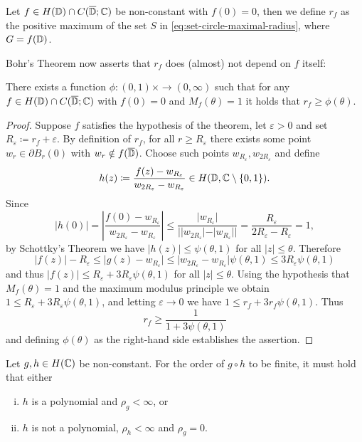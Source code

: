 \begin{definition}
    Let $f \in H(\mathbb{D}) \cap C(\overline{\mathbb{D}}; \mathbb{C})$ be non-constant with $f(0) = 0$, then we define $r_f$ as the positive maximum of the set $S$ in \eqref{eq:set-circle-maximal-radius}, where $G = f(\mathbb{D})$.
\end{definition}

Bohr's Theorem now asserts that $r_f$ does (almost) not depend on $f$ itself:

\begin{theorem}[Bohr] \label{thm:bohr}
    There exists a function ${\phi : (0, 1) \times \to (0, \infty)}$ such that for any $f \in H(\mathbb{D}) \cap C(\overline{\mathbb{D}}; \mathbb{C})$ with $f(0) = 0$ and $M_f(\theta) = 1$ it holds that $r_f \geq \phi(\theta)$.
\end{theorem}

\begin{proof}
    Suppose $f$ satisfies the hypothesis of the theorem, let $\varepsilon > 0$ and set $R_\varepsilon \coloneqq r_f + \varepsilon$. By definition of $r_f$, for all $r \geq R_\varepsilon$ there exists some point $w_r \in \partial B_r(0)$ with $w_r \notin f(\overline{\mathbb{D}})$. Choose such points $w_{R_\varepsilon}, w_{2 R_\varepsilon}$ and define
    $$ h(z) \coloneqq \frac{f(z) - w_{R_\varepsilon}}{w_{2 R_\varepsilon} - w_{R_\varepsilon}} \in H(\mathbb{D}, \mathbb{C} \setminus \{ 0, 1 \}). $$
    Since
    $$ \vert h(0) \vert = \left\vert \frac{f(0) - w_{R_\varepsilon}}{w_{2 R_\varepsilon} - w_{R_\varepsilon}} \right\vert \leq \frac{\vert w_{R_\varepsilon} \vert}{\vert \vert w_{2 R_\varepsilon} \vert - \vert w_{R_\varepsilon} \vert \vert} = \frac{R_\varepsilon}{2 R_\varepsilon - R_\varepsilon} = 1, $$
    by Schottky's Theorem we have $\vert h(z) \vert \leq \psi(\theta, 1)$ for all $\vert z \vert \leq \theta$. Therefore
    $$ \vert f(z) \vert - R_\varepsilon \leq \vert g(z) - w_{R_\varepsilon} \vert \leq \vert w_{2 R_\varepsilon} - w_{R_\varepsilon} \vert \psi(\theta, 1) \leq 3 R_\varepsilon \psi(\theta, 1) $$
    and thus $\vert f(z) \vert \leq R_\varepsilon + 3 R_\varepsilon \psi(\theta, 1)$ for all $\vert z \vert \leq \theta$. Using the hypothesis that $M_f(\theta) = 1$ and the maximum modulus principle we obtain $1 \leq R_\varepsilon + 3 R_\varepsilon \psi(\theta, 1)$, and letting $\varepsilon \to 0$ we have $1 \leq r_f + 3 r_f \psi(\theta, 1)$. Thus
    $$ r_f \geq \frac{1}{1 + 3 \psi(\theta, 1)}$$
    and defining $\phi(\theta)$ as the right-hand side establishes the assertion.
\end{proof}

\begin{theorem}[Pólya] \label{thm:polya}
    Let $g, h \in H(\mathbb{C})$ be non-constant. For the order of $g \circ h$ to be finite, it must hold that either
    \begin{enumerate}[i.]
        \item $h$ is a polynomial and $\rho_g < \infty$, or
        \item $h$ is not a polynomial, $\rho_h < \infty$ and $\rho_g = 0$.
    \end{enumerate}
\end{theorem}

